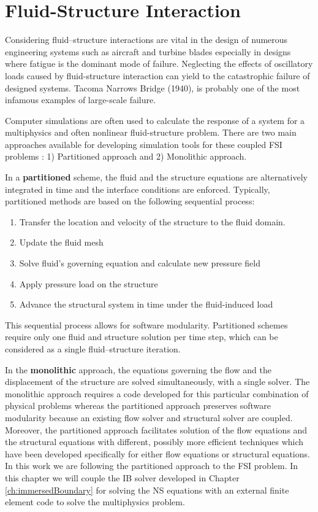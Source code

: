\section{Fluid-Structure Interaction}
Considering fluid–structure interactions are vital in the design of numerous engineering systems such as aircraft and turbine blades especially in designs where fatigue is the dominant mode of failure. Neglecting the effects of oscillatory loads caused by fluid-structure interaction can yield to the catastrophic failure of designed systems. Tacoma Narrows Bridge (1940), is probably one of the most infamous examples of large-scale failure.

Computer simulations are often used to calculate the response of a system for a multiphysics and often nonlinear fluid-structure problem. There are two main approaches available for developing simulation tools for these coupled FSI problems \cite{michler2004monolithic}: 1) Partitioned approach and 2) Monolithic approach.

In a \textbf{partitioned} scheme, the fluid and the structure equations are alternatively integrated in
time and the interface conditions are enforced. Typically, partitioned methods are based on the following sequential process:

\begin{enumerate}
	\item Transfer the location and velocity of the structure to the fluid domain.
	\item Update the fluid mesh
	\item Solve fluid's governing equation and calculate new pressure field
	\item Apply pressure load on the structure
	\item Advance the structural system in time under the fluid-induced load
\end{enumerate}

This sequential process allows for software modularity. Partitioned schemes require only one fluid
and structure solution per time step, which can be considered as a single fluid–structure iteration.

In the \textbf{monolithic} approach, the equations governing the flow and the displacement of the structure are solved simultaneously, with a single solver. The monolithic approach requires a code developed for this particular combination of physical problems whereas the partitioned approach preserves software modularity because an existing flow solver and structural solver are coupled. Moreover, the partitioned approach facilitates solution of the flow equations and the structural equations with different, possibly more efficient techniques which have been developed specifically for either flow equations or structural equations. In this work we are following the partitioned approach to the FSI problem. In this chapter we will couple the IB solver developed in Chapter \ref{ch:immersedBoundary} for solving the NS equations with an external finite element code to solve the multiphysics problem.

